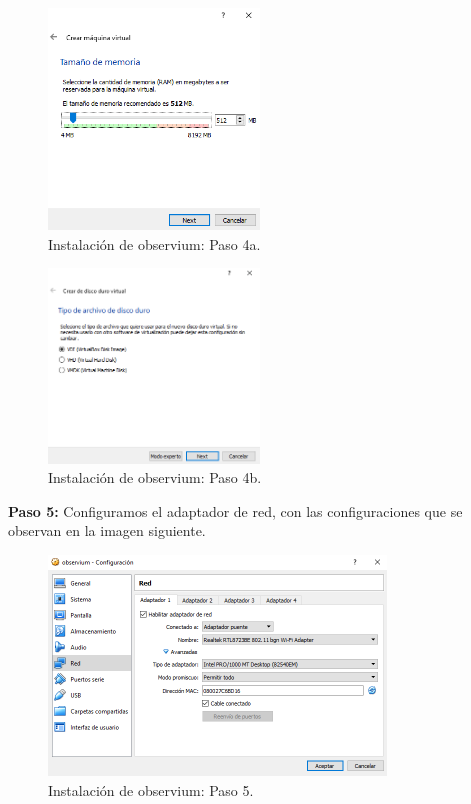 \begin{figure}[htbp!]
	\centering
		\includegraphics[width=0.5\textwidth]{images/desarrollo/instalarObservium_paso4a.png}
	\caption{Instalación de observium: Paso 4a.}
\end{figure} 

\pagebreak
\begin{figure}[htbp!]
	\centering
		\includegraphics[width=0.5\textwidth]{images/desarrollo/instalarObservium_paso4b.png}
	\caption{Instalación de observium: Paso 4b.}
\end{figure} 

\noindent
\textbf{Paso 5:} Configuramos el adaptador de red, con las configuraciones que se observan en la imagen siguiente. 

\begin{figure}[htbp!]
	\centering
		\includegraphics[width=0.8\textwidth]{images/desarrollo/instalarObservium_paso5.png}
	\caption{Instalación de observium: Paso 5.}
\end{figure} 

